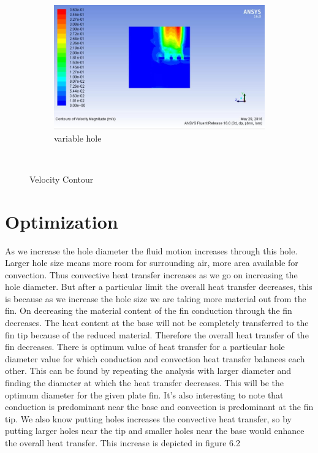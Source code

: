 \begin{figure}[h]
\begin{subfigure}[b]{0.5\textwidth}
 		\includegraphics[width=\textwidth]{138.jpg}
 		\caption{variable hole}
 		\label{fig:unstructured}
 	\end{subfigure}
 	
 	~ %
 	\caption{Velocity Contour }\label{fig:Meshing}
 \end{figure}


\section{Optimization}

	As we increase the hole diameter the fluid motion increases through this hole. Larger hole size means more room for surrounding air, more area available for convection. Thus convective heat transfer increases as we go on increasing the hole diameter. But after a particular limit the overall heat transfer decreases, this is because as we increase the hole size we are taking more material out from the fin. On decreasing the material content of the fin conduction through the fin decreases. The heat content at the base will not be completely transferred to the fin tip because of the reduced material. Therefore the overall heat transfer of the fin decreases. There is optimum value of heat transfer for a particular hole diameter value for which conduction and convection heat transfer balances each other. This can be found by repeating the analysis with larger diameter and finding the diameter at which the heat transfer decreases. This will be the optimum diameter for the given plate fin.
	It’s also interesting to note that conduction is predominant near the base and convection is predominant at the fin tip. We also know putting holes increases the convective heat transfer, so by putting larger holes near the tip and smaller holes near the base would enhance the overall heat transfer. This increase is depicted in figure 6.2


